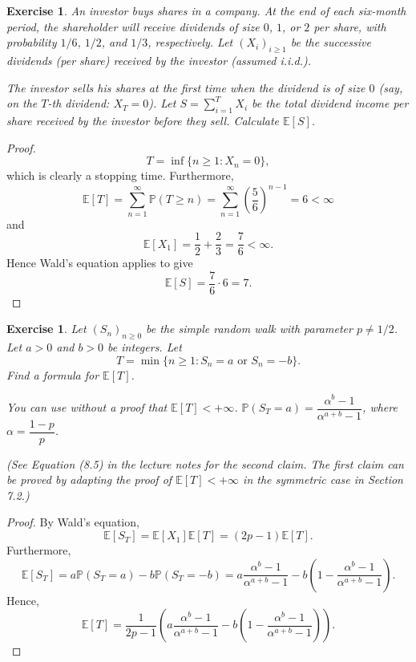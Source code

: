 \documentclass{article}
\newtheorem{exercise}[theorem]{Exercise}
\begin{document}
\begin{exercise}
An investor buys shares in a company. At the end of each six-month period, the shareholder will receive dividends of size $0$, $1$, or $2$ per share, with probability $1/6$, $1/2$, and $1/3$, respectively. Let $(X_i)_{i \geq 1}$ be the successive dividends (per share) received by the investor (assumed i.i.d.).

\medskip

The investor sells his shares at the first time when the dividend is of size $0$ (say, on the $T$-th dividend: $X_T = 0$). Let $S = \sum_{i=1}^{T} X_i$ be the total dividend income per share received by the investor before they sell. Calculate $\mathbb{E}[S]$.
\end{exercise}
\begin{proof}
\[T=\inf\{n\geq1:X_n=0\},\] which is clearly a stopping time. Furthermore, \[\mathbb{E}[T]=\sum_{n=1}^\infty\mathbb{P}(T\geq n)=\sum_{n=1}^\infty\left(\frac{5}{6}\right)^{n-1}=6<\infty\] and\[\mathbb{E}[X_1]=\frac{1}{2}+\frac{2}{3}=\frac{7}{6}<\infty.\] Hence Wald's equation applies to give\[\mathbb{E}[S]=\frac{7}{6}\cdot 6=7.\]
\end{proof}

\begin{exercise}
Let $(S_n)_{n \geq 0}$ be the simple random walk with parameter $p \neq 1/2$. Let $a > 0$ and $b > 0$ be integers. Let 
\[
T = \min\{n \geq 1 : S_n = a \text{ or } S_n = -b\}.
\]
Find a formula for $\mathbb{E}[T]$.

\medskip

\textit{You can use without a proof that $\mathbb{E}[T] < +\infty$. $\mathbb{P}(S_T = a) = \dfrac{\alpha^b - 1}{\alpha^{a+b} - 1}$, where $\alpha = \dfrac{1 - p}{p}$.}

\textit{(See Equation (8.5) in the lecture notes for the second claim. The first claim can be proved by adapting the proof of $\mathbb{E}[T] < +\infty$ in the symmetric case in Section 7.2.)}
\end{exercise}
\begin{proof}
By Wald's equation,\[\mathbb{E}[S_T]=\mathbb{E}[X_1]\mathbb{E}[T]=(2p-1)\mathbb{E}[T].\] Furthermore,\[\mathbb{E}[S_T]=a\mathbb{P}(S_T=a)-b\mathbb{P}(S_T=-b)=a\frac{\alpha^b-1}{\alpha^{a+b}-1}-b\left(1-\frac{\alpha^b-1}{\alpha^{a+b}-1}\right).\]Hence,\[\mathbb{E}[T]=\frac{1}{2p-1}\left(a\frac{\alpha^b-1}{\alpha^{a+b}-1}-b\left(1-\frac{\alpha^b-1}{\alpha^{a+b}-1}\right)\right).\]
\end{proof}
\end{document}
